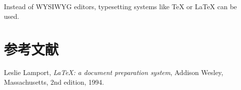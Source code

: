 \documentclass[UTF8,oneside]{ctexbook}
\begin{document}






%


Instead of WYSIWYG editors, typesetting systems like \TeX{} or \LaTeX{} \cite{lamport94} can be used.

\part{参考文献}

\begin{thebibliography}{9}

        Leslie Lamport,
        \textit{\LaTeX: a document preparation system},
        Addison Wesley, Massachusetts,
        2nd edition,
        1994.

\end{thebibliography}
\end{document}

